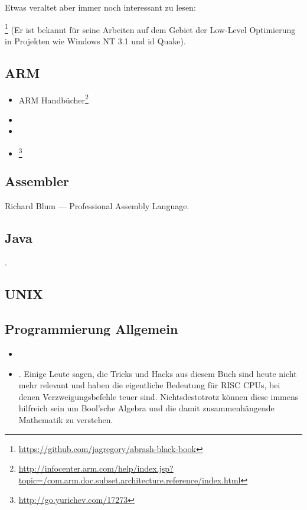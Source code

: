 Etwas veraltet aber immer noch interessant zu lesen:

\MAbrash\footnote{\AlsoAvailableAs \url{https://github.com/jagregory/abrash-black-book}}
(Er ist bekannt für seine Arbeiten auf dem Gebiet der Low-Level Optimierung in Projekten wie Windows NT 3.1 und id Quake).

\subsection{ARM}

\begin{itemize}
\item ARM Handbücher\footnote{\AlsoAvailableAs \url{http://infocenter.arm.com/help/index.jsp?topic=/com.arm.doc.subset.architecture.reference/index.html}}

\item \ARMSevenRef

\item \ARMSixFourRefURL

\item \ARMCookBook\footnote{\AlsoAvailableAs \url{http://go.yurichev.com/17273}}
\end{itemize}

\subsection{Assembler}

Richard Blum --- Professional Assembly Language.

\subsection{Java}

\JavaBook.

\subsection{UNIX}

\TAOUP

\subsection{Programmierung Allgemein}

\begin{itemize}

	\item \RobPikePractice
	
	\item \HenryWarren.
	Einige Leute sagen, die Tricks und Hacks aus diesem Buch sind heute nicht mehr relevant und haben die eigentliche Bedeutung für \ac{RISC} \ac{CPU}s, bei denen Verzweigungsbefehle teuer sind.
	Nichtsdestotrotz können diese immens hilfreich sein um Bool'sche Algebra und die damit zusammenhängende Mathematik zu verstehen.
	
\end{itemize}


